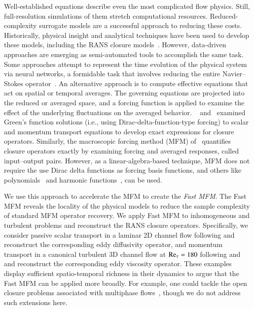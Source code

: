 \documentclass[11pt,sort&compress]{elsarticle}
\begin{document}
Well-established equations describe even the most complicated flow physics.
Still, full-resolution simulations of them stretch computational resources. 
Reduced-complexity surrogate models are a successful approach to reducing these costs.
Historically, physical insight and analytical techniques have been used to develop these models, including the RANS closure models~\citep{tennekes1972first}.
However, data-driven approaches are emerging as semi-automated tools to accomplish the same task.
Some approaches attempt to represent the time evolution of the physical system via neural networks, a formidable task that involves reducing the entire Navier--Stokes operator~\citep{li2020fourier,lu2021learning}.
An alternative approach is to compute effective equations that act on spatial or temporal averages. 
The governing equations are projected into the reduced or averaged space, and a forcing function is applied to examine the effect of the underlying fluctuations on the averaged behavior. 
~\citet{kraichnan1987eddy} and~\citet{hamba1995analysis} examined Green's function solutions (i.e., using Dirac-delta-function-type forcing) to scalar and momentum transport equations to develop exact expressions for closure operators. 
Similarly, the macroscopic forcing method (MFM) of~\citet{maniMacroscopicForcingMethod2021} quantifies closure operators exactly by examining forcing and averaged responses, called input--output pairs. 
However, as a linear-algebra-based technique, MFM does not require the use Dirac delta functions as forcing basis functions, and others like polynomials~\citep{liu21} and harmonic functions~\citep{shirian22}, can be used. 

We use this approach to accelerate the MFM to create the \textit{Fast MFM}. 
The Fast MFM reveals the locality of the physical models to reduce the sample complexity of standard MFM operator recovery.
We apply Fast MFM to inhomogeneous and turbulent problems and reconstruct the RANS closure operators. 
Specifically, we consider passive scalar transport in a laminar 2D channel flow following \citet{maniMacroscopicForcingMethod2021} and reconstruct the corresponding eddy diffusivity operator, and momentum transport in a canonical turbulent 3D channel flow at $\mbox{\text{Re}}_\tau = 180$ following \citet{hamba2005nonlocal} and \citet{park21} and reconstruct the corresponding eddy viscosity operator.
These examples display sufficient spatio-temporal richness in their dynamics to argue that the Fast MFM can be applied more broadly. 
For example, one could tackle the open closure problems associated with multiphase flows~\citep{bryngelson19,bryngelson19_ML,vie2016particle,ma2016using}, though we do not address such extensions here.
\end{document}
